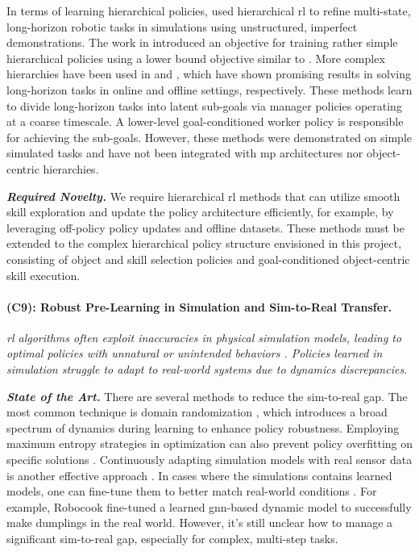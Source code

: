 \documentclass{erc-B2}
\begin{document}
In terms of learning hierarchical policies, \cite{gupta2019relay} used hierarchical \gls*{rl} to refine multi-state, long-horizon robotic tasks in simulations using unstructured, imperfect demonstrations. The work in \cite{huang2023reparameterized} introduced an objective for training rather simple hierarchical policies using a lower bound objective similar to \cite{celik2022specializing}. More complex hierarchies have been used in \cite{hafner2022deep} and \cite{xu2023iql}, which have shown promising results in solving long-horizon tasks in online and offline settings, respectively. These methods learn to divide long-horizon tasks into latent sub-goals via manager policies operating at a coarse timescale. A lower-level goal-conditioned worker policy is responsible for achieving the sub-goals. However, these methods were demonstrated on simple simulated tasks and have not been integrated with \gls*{mp} architectures nor object-centric hierarchies.


\textit{\textbf{Required Novelty.}} We require hierarchical \gls*{rl} methods that can utilize smooth skill exploration and update the policy architecture efficiently, for example, by leveraging off-policy policy updates and offline datasets.  These methods must be extended to the complex hierarchical policy structure envisioned in this project, consisting of object and skill selection policies and goal-conditioned object-centric skill execution. %

\paragraph{(C9): Robust Pre-Learning in Simulation and Sim-to-Real Transfer.}
\textit{\gls*{rl} algorithms often exploit inaccuracies in physical simulation models, leading to optimal policies with unnatural or unintended behaviors \cite{zhao2020sim2real}. Policies learned in simulation struggle to adapt to real-world systems due to dynamics discrepancies.}

\textit{\textbf{State of the Art.}} There are several methods to reduce the sim-to-real gap. The most common technique is domain randomization \cite{tobin2017domain}, which introduces a broad spectrum of dynamics during learning to enhance policy robustness. Employing maximum entropy strategies in optimization can also prevent policy overfitting on specific solutions \cite{eysenbach2022maximum, tiboni2023domain}. Continuously adapting simulation models with real sensor data is another effective approach \cite{clavera2018learning}.
In cases where the simulations contains learned models, one can fine-tune them to better match real-world conditions \cite{song2020learning}. For example, Robocook \cite{shi2023robocook} fine-tuned a learned \gls*{gnn}-based dynamic model to successfully make dumplings in the real world. However, it's still unclear how to manage a significant sim-to-real gap, especially for complex, multi-step tasks.
\end{document}
